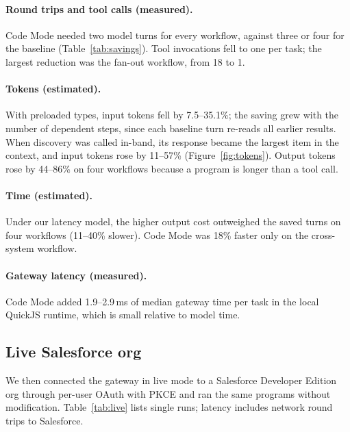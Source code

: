 \documentclass[11pt]{article}
\begin{document}
\paragraph{Round trips and tool calls (measured).} Code Mode needed two model turns for every workflow, against three or four for the baseline (Table~\ref{tab:savings}). Tool invocations fell to one per task; the largest reduction was the fan-out workflow, from 18 to 1.
\paragraph{Tokens (estimated).} With preloaded types, input tokens fell by 7.5--35.1\%; the saving grew with the number of dependent steps, since each baseline turn re-reads all earlier results. When discovery was called in-band, its response became the largest item in the context, and input tokens rose by 11--57\% (Figure~\ref{fig:tokens}). Output tokens rose by 44--86\% on four workflows because a program is longer than a tool call.
\paragraph{Time (estimated).} Under our latency model, the higher output cost outweighed the saved turns on four workflows (11--40\% slower). Code Mode was 18\% faster only on the cross-system workflow.
\paragraph{Gateway latency (measured).} Code Mode added 1.9--2.9\,ms of median gateway time per task in the local QuickJS runtime, which is small relative to model time.

\subsection{Live Salesforce org}
We then connected the gateway in live mode to a Salesforce Developer Edition org through per-user OAuth with PKCE and ran the same programs without modification. Table~\ref{tab:live} lists single runs; latency includes network round trips to Salesforce.
\end{document}
